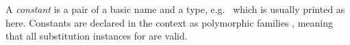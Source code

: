 \begin{isabellebody}
\begin{isamarkuptext}
  \medskip A \emph{constant} is a pair of a basic name and a type,
  e.g.\  which is usually printed as 
  here.  Constants are declared in the context as polymorphic families
  , meaning that all substitution instances  for  are valid.


\end{isamarkuptext}
\end{isabellebody}
